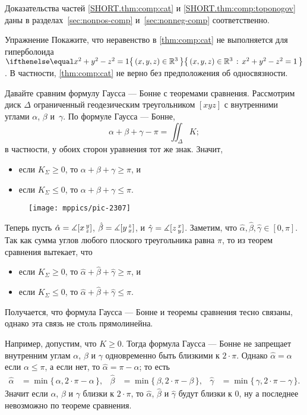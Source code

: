 Доказательства частей \ref{SHORT.thm:comp:cat} и \ref{SHORT.thm:comp:toponogov} даны в разделах~\ref{sec:nonpos-comp} и~\ref{sec:nonneg-comp} соответственно.

\begin{thm}{Упражнение}\label{ex:thm:comp:cat:nsc}
Покажите, что неравенство в \ref{thm:comp:cat} не выполняется для гиперболоида $\set{(x,y,z)\in\mathbb{R}^3}{x^2+y^2-z^2=1}$.
В частности, \ref{thm:comp:cat} не верно без предположения об односвязности.
\end{thm}

Давайте сравним формулу Гаусса --- Бонне с теоремами сравнения.
Рассмотрим диск $\Delta$ ограниченный геодезическим треугольником $[xyz]$ с внутренними углами $\alpha$, $\beta$ и~$\gamma$.
По формуле Гаусса --- Бонне, 
\[\alpha+\beta+\gamma-\pi=\iint_\Delta K;\]
в частности, у обоих сторон уравнения тот же знак.
Значит,
\begin{itemize}
\item если $K_\Sigma\ge 0$, то $\alpha+\beta+\gamma\ge\pi$, и
\item если $K_\Sigma\le 0$, то $\alpha+\beta+\gamma\le\pi$.
\end{itemize}

\begin{wrapfigure}{r}{35mm}
\centering
\vskip-10mm
\texttt{[image: mppics/pic-2307]}
\end{wrapfigure}

Теперь пусть 
$\hat\alpha\z=\measuredangle\hinge {x}{y}{z}$,
$\hat\beta\z=\measuredangle\hinge {y}{z}{x}$,
и $\hat\gamma\z=\measuredangle\hinge {z}{x}{y}$.
Заметим, что $\hat\alpha,\hat\beta,\hat\gamma\in[0,\pi]$.
Так как сумма углов любого плоского треугольника равна $\pi$, то из теорем сравнения вытекает, что
\begin{itemize}
\item если $K_\Sigma\ge 0$, то $\hat\alpha+\hat\beta+\hat\gamma\ge\pi$, и
\item если $K_\Sigma\le 0$, то $\hat\alpha+\hat\beta+\hat\gamma\le\pi$.
\end{itemize}

Получается, что формула Гаусса --- Бонне и теоремы сравнения тесно связаны,
однако эта связь не столь прямолинейна.

Например, допустим, что $K\ge 0$.
Тогда формула Гаусса --- Бонне не запрещает внутренним углам $\alpha$, $\beta$ и $\gamma$ одновременно быть близкими к $2\cdot\pi$.
Однако $\hat \alpha=\alpha$ если $\alpha\le \pi$, а если нет, то $\hat \alpha=\pi-\alpha$;
то есть
\begin{align*}
\hat \alpha&=\min\{\,\alpha,2\cdot\pi-\alpha\,\},
&
\hat\beta &=\min\{\,\beta,2\cdot\pi-\beta\,\},
&
\hat\gamma&=\min\{\,\gamma,2\cdot\pi-\gamma\,\}.
\end{align*}
Значит если $\alpha$, $\beta$ и $\gamma$ близки к $2\cdot\pi$, то $\hat\alpha$, $\hat\beta$ и $\hat\gamma$ будут близки к $0$,
ну а последнее невозможно по теореме сравнения.






